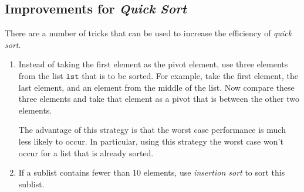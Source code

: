 \subsection{Improvements for \emph{Quick Sort}}
There are a number of tricks that can be used to increase the efficiency of \emph{quick sort}.
\begin{enumerate}
\item Instead of taking the first element as the pivot element, use three elements from the list
      $\mathtt{lst}$ that is to be sorted.  For example, take the first element, the last element, and an
      element from the middle of the list.  Now compare these three elements and take that element as
      a pivot that is between the other two elements.

      The advantage of this strategy is that the worst case performance is much less likely to occur.  In
      particular,  using this strategy the worst case won't occur for a list that is already
      sorted.
\item If a sublist contains fewer than 10 elements, use \emph{insertion sort} to sort this sublist.


\end{enumerate}
